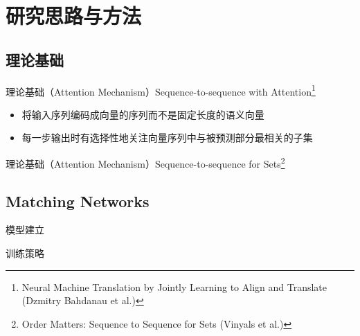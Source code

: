 \documentclass[10pt]{beamer}
\begin{document}

\section{研究思路与方法}
\subsection{理论基础}



\begin{frame}{理论基础（Attention Mechanism）}{Sequence-to-sequence with Attention\footnote{Neural Machine Translation by Jointly Learning to Align and Translate (Dzmitry Bahdanau et al.)}}
\begin{itemize}
\item 将输入序列编码成向量的序列而不是固定长度的语义向量
\item 每一步输出时有选择性地关注向量序列中与被预测部分最相关的子集
\end{itemize}


\end{frame}




\begin{frame}{理论基础（Attention Mechanism）}{Sequence-to-sequence for Sets\footnote{Order Matters: Sequence to Sequence for Sets (Vinyals et al.)}}


\end{frame}

\subsection{Matching Networks}


\begin{frame}{模型建立}

\end{frame}




\begin{frame}{训练策略}

\end{frame}


\end{document}
